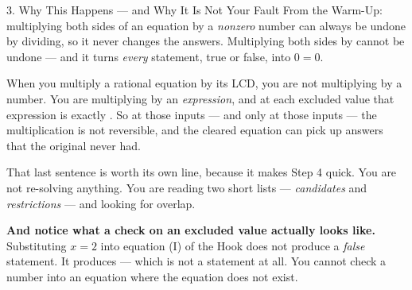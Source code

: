 \documentclass[10pt]{article}
\begin{document}
\begin{notesbox}{3. Why This Happens --- and Why It Is Not Your Fault}
From the Warm-Up: multiplying both sides of an equation by a \emph{nonzero} number can always be undone
by dividing, so it never changes the answers. Multiplying both sides by \blank{1.2cm} cannot be
undone --- and it turns \emph{every} statement, true or false, into $0=0$.

\vspace{4pt}
When you multiply a rational equation by its LCD, you are not multiplying by a number. You are
multiplying by an \emph{expression}, and at each excluded value that expression is exactly
\blank{1.2cm}. So at those inputs --- and only at those inputs --- the multiplication is not
reversible, and the cleared equation can pick up answers that the original never had.

\vspace{4pt}
\begin{center}
\end{center}

\vspace{4pt}
That last sentence is worth its own line, because it makes Step 4 quick. You are not re-solving
anything. You are reading two short lists --- \emph{candidates} and \emph{restrictions} --- and looking
for overlap.

\vspace{3pt}
\textbf{And notice what a check on an excluded value actually looks like.} Substituting $x=2$ into
equation (I) of the Hook does not produce a \emph{false} statement. It produces \blank{4.6cm}
--- which is not a statement at all. You cannot check a number into an equation where the equation does
not exist.
\end{notesbox}
\end{document}
